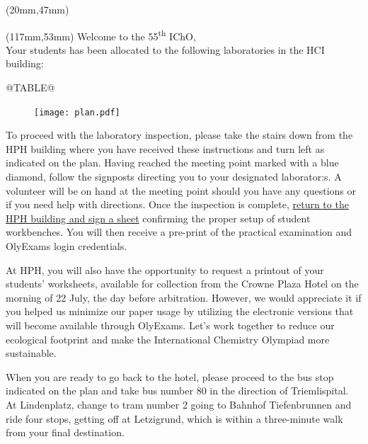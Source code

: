 \documentclass[12pt,a4paper]{article}
\begin{document}
	
	\pagestyle{fancy}
	\fancyhf{} %

	\begin{textblock*}{8cm}(20mm,47mm) 
		\centering \bfseries \rule[-6.5mm]{0pt}{30mm}
		{\fontsize{70}{85}\selectfont {@CODE@}}
	\end{textblock*}

	\begin{textblock*}{7cm}(117mm,53mm)
		Welcome to the 55\textsuperscript{th} IChO,\\[1.5ex]

		Your students has been allocated to the following
    laboratories in the HCI building:
 	\end{textblock*}

	\vspace*{44mm}

    \renewcommand{\arraystretch}{1.5}
	@TABLE@

	\vspace*{2em}
	
	\begin{figure}
		\centering
		\texttt{[image: plan.pdf]}
	\end{figure}
	To proceed with the laboratory inspection, please take the stairs
	down from the HPH building where you have received these instructions 
	and turn left as indicated on the plan. Having reached the meeting
	point marked with a blue diamond, follow the signposts directing you
	to your designated laborator{:s}. A volunteer will be on hand at the 
	meeting point should you have any questions or if you need help with
	directions. Once the inspection is complete, \uline{return to the HPH building
	and sign a sheet} confirming the proper setup of student workbenches.
	You will then receive a pre-print of the practical examination and
	OlyExams login credentials.
	
	\vspace*{1em}
	
	At HPH, you will also have the opportunity to request a printout of
	your students' worksheets, available for collection from the
	Crowne Plaza Hotel on the morning of 22 July, the day before arbitration. However, 
	we would appreciate it if you helped us minimize our paper usage by utilizing the
	electronic versions that will become available through OlyExams. Let's work together
	to reduce our ecological footprint and make the International Chemistry Olympiad more 
	sustainable.
	
	\vspace*{1em}
	
	When you are ready to go back to the hotel, please proceed to the 
	bus stop indicated on the plan and take bus number 80 in the direction
	of Triemlispital. At Lindenplatz, change to tram number 2 going to
	Bahnhof Tiefenbrunnen and ride four stops, getting off at Letzigrund, 
	which is within a three-minute walk from your final destination.
\end{document}
